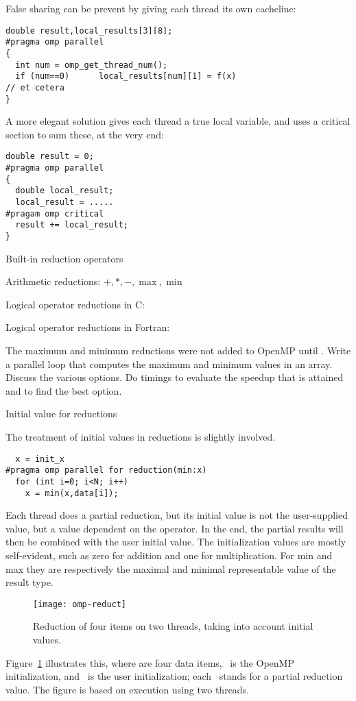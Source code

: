 False sharing can be prevent by giving each thread its own cacheline:
\begin{lstlisting}
double result,local_results[3][8];
#pragma omp parallel
{
  int num = omp_get_thread_num();
  if (num==0)      local_results[num][1] = f(x)
// et cetera
}
\end{lstlisting}
A more elegant solution gives each thread a true local variable,
and uses a critical section to sum these, at the very end:
\begin{lstlisting}
double result = 0;
#pragma omp parallel
{
  double local_result;
  local_result = .....
#pragam omp critical
  result += local_result;
}
\end{lstlisting}

 {Built-in reduction operators}

Arithmetic reductions: $+,*,-,\max,\min$

Logical operator reductions in C: \n{& && | || ^}

Logical operator reductions in Fortran:

\begin{exercise}
  The maximum and minimum reductions were not added to OpenMP until
  . Write a parallel loop that computes the maximum and
  minimum values in an array. Discuss the various options. Do timings
  to evaluate the speedup that is attained and to find the best option.
\end{exercise}

 {Initial value for reductions}

The treatment of initial values in reductions is slightly involved.
\begin{lstlisting}
  x = init_x
#pragma omp parallel for reduction(min:x)
  for (int i=0; i<N; i++)
    x = min(x,data[i]);
\end{lstlisting}
Each thread does a partial reduction, but its initial value is not the
user-supplied  value, but a value dependent on the
operator. In the end, the partial results will then be combined with
the user initial value.
The initialization values are mostly self-evident, such as zero for
addition and one for multiplication. For min and max they are
respectively the maximal and minimal representable value of the result type.

\begin{figure}[ht]
  \texttt{[image: omp-reduct]}
  \caption{Reduction of four items on two threads, taking into account
    initial values.}
  \label{fig:omp-reduct}  
\end{figure}
%
Figure~\ref{fig:omp-reduct} illustrates this, where  are
four data items, ~is the OpenMP initialization, and ~is the
user initialization; each ~stands for a partial reduction value.
The figure is based on execution using two threads.

